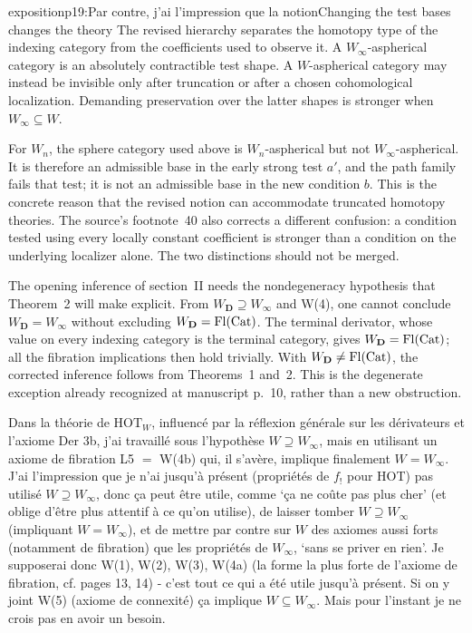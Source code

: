 \begin{dcomment}{exposition}{p19:Par contre, j'ai l'impression que la notion}{Changing the test bases changes the theory}
The revised hierarchy separates the homotopy type of the indexing category from the coefficients used to observe it. A \(W_\infty\)-aspherical category is an absolutely contractible test shape. A \(W\)-aspherical category may instead be invisible only after truncation or after a chosen cohomological localization. Demanding preservation over the latter shapes is stronger when \(W_\infty\subseteq W\).

For \(W_n\), the sphere category used above is \(W_n\)-aspherical but not \(W_\infty\)-aspherical. It is therefore an admissible base in the early strong test \(a'\), and the path family fails that test; it is not an admissible base in the new condition \(b\). This is the concrete reason that the revised notion can accommodate truncated homotopy theories. The source's footnote~40 also corrects a different confusion: a condition tested using every locally constant coefficient is stronger than a condition on the underlying localizer alone. The two distinctions should not be merged.

The opening inference of section~II needs the nondegeneracy hypothesis that Theorem~2 will make explicit. From \(W_{\mathbf D}\supseteq W_\infty\) and W(4), one cannot conclude \(W_{\mathbf D}=W_\infty\) without excluding \(W_{\mathbf D}=\mathrm{Fl}(\mathrm{Cat})\). The terminal derivator, whose value on every indexing category is the terminal category, gives \(W_{\mathbf D}=\mathrm{Fl}(\mathrm{Cat})\); all the fibration implications then hold trivially. With \(W_{\mathbf D}\ne\mathrm{Fl}(\mathrm{Cat})\), the corrected inference follows from Theorems~1 and~2. This is the degenerate exception already recognized at manuscript p.~10, rather than a new obstruction.
\end{dcomment}


Dans la théorie de $\mathrm{HOT}_W$, influencé par la réflexion générale sur les dérivateurs et l'axiome Der 3b, j'ai travaillé sous l'hypothèse $W \supseteq W_\infty$, mais en utilisant un axiome de fibration L5 $=$ W(4b) qui, il s'avère, implique finalement $W = W_\infty$. J'ai l'impression que je n'ai jusqu'à présent (propriétés de $f_!$ pour HOT) pas utilisé $W \supseteq W_\infty$, donc ça peut être utile, comme `ça ne coûte pas plus cher' (et oblige d'être plus attentif à ce qu'on utilise), de laisser tomber $W \supseteq W_\infty$ (impliquant $W = W_\infty$), et de mettre par contre sur $W$ des axiomes aussi forts (notamment de fibration) que les propriétés de $W_\infty$, `sans se priver en rien'. Je supposerai donc W(1), W(2), W(3), W(4a) (la forme la plus forte de l'axiome de fibration, cf. pages 13, 14) - c'est tout ce qui a été utile jusqu'à présent. Si on y joint W(5) (axiome de connexité) ça implique $W \subseteq W_\infty$. Mais pour l'instant je ne crois pas en avoir un besoin.


